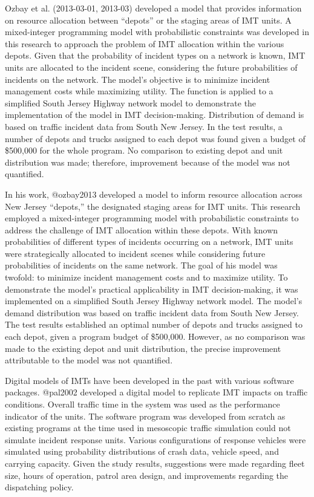 \documentclass[
  letterpaper,
  DIV=11,
  numbers=noendperiod]{scrreprt}
\begin{document}
Ozbay et al. (2013-03-01, 2013-03) developed a model that provides
information on resource allocation between ``depots'' or the staging
areas of IMT units. A mixed-integer programming model with probabilistic
constraints was developed in this research to approach the problem of
IMT allocation within the various depots. Given that the probability of
incident types on a network is known, IMT units are allocated to the
incident scene, considering the future probabilities of incidents on the
network. The model's objective is to minimize incident management costs
while maximizing utility. The function is applied to a simplified South
Jersey Highway network model to demonstrate the implementation of the
model in IMT decision-making. Distribution of demand is based on traffic
incident data from South New Jersey. In the test results, a number of
depots and trucks assigned to each depot was found given a budget of
\$500,000 for the whole program. No comparison to existing depot and
unit distribution was made; therefore, improvement because of the model
was not quantified.

In his work, @ozbay2013 developed a model to inform resource allocation
across New Jersey ``depots,'' the designated staging areas for IMT
units. This research employed a mixed-integer programming model with
probabilistic constraints to address the challenge of IMT allocation
within these depots. With known probabilities of different types of
incidents occurring on a network, IMT units were strategically allocated
to incident scenes while considering future probabilities of incidents
on the same network. The goal of his model was twofold: to minimize
incident management costs and to maximize utility. To demonstrate the
model's practical applicability in IMT decision-making, it was
implemented on a simplified South Jersey Highway network model. The
model's demand distribution was based on traffic incident data from
South New Jersey. The test results established an optimal number of
depots and trucks assigned to each depot, given a program budget of
\$500,000. However, as no comparison was made to the existing depot and
unit distribution, the precise improvement attributable to the model was
not quantified.

Digital models of IMTs have been developed in the past with various
software packages. @pal2002 developed a digital model to replicate IMT
impacts on traffic conditions. Overall traffic time in the system was
used as the performance indicator of the units. The software program was
developed from scratch as existing programs at the time used in
mesoscopic traffic simulation could not simulate incident response
units. Various configurations of response vehicles were simulated using
probability distributions of crash data, vehicle speed, and carrying
capacity. Given the study results, suggestions were made regarding fleet
size, hours of operation, patrol area design, and improvements regarding
the dispatching policy.
\end{document}
